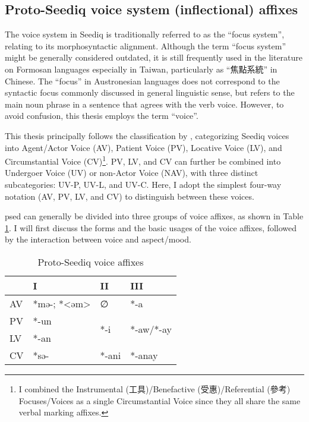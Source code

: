 \subsection{Proto-Seediq voice system (inflectional) affixes} \label{sec:psed_voice_affixes}

The voice system in Seediq is traditionally referred to as the ``focus system'', relating to its morphosyntactic alignment. Although the term ``focus system'' might be generally considered outdated, it is still frequently used in the literature on Formosan languages especially in Taiwan, particularly as ``焦點系統'' in Chinese. The ``focus'' in Austronesian languages does not correspond to the syntactic focus commonly discussed in general linguistic sense, but refers to the main noun phrase in a sentence that agrees with the verb voice. However, to avoid confusion, this thesis employs the term ``voice''.

This thesis principally follows the classification by \textcite{Sung2018Sedgrammar,Lee2018Trugrammar}, categorizing Seediq voices into Agent/Actor Voice (AV), Patient Voice (PV), Locative Voice (LV), and Circumstantial Voice (CV)\footnote{I combined the Instrumental (工具)/Benefactive (受惠)/Referential (參考) Focuses/Voices as a single Circumstantial Voice since they all share the same verbal marking affixes.}. PV, LV, and CV can further be combined into Undergoer Voice (UV) or non-Actor Voice (NAV), with three distinct subcategories: UV-P, UV-L, and UV-C. Here, I adopt the simplest four-way notation (AV, PV, LV, and CV) to distinguish between these voices.

\acl{psed} can generally be divided into three groups of voice affixes, as shown in Table \ref{tab:psed_voice}. I will first discuss the forms and the basic usages of the voice affixes, followed by the interaction between voice and aspect/mood.

\begin{table}[!htbp]
\centering
\caption{Proto-Seediq voice affixes}
\label{tab:psed_voice}
\begin{tabular}{llll}
\hline
   & I           & II                   & III                        \\ \hline
AV & *mə-; *<əm> & ∅                    & *-a                        \\
PV & *-un        & \multirow{2}{*}{*-i} & \multirow{2}{*}{*-aw/*-ay} \\
LV & *-an        &                      &                            \\
CV & *sə-        & *-ani                & *-anay                     \\ \hline
\end{tabular}
\end{table}


